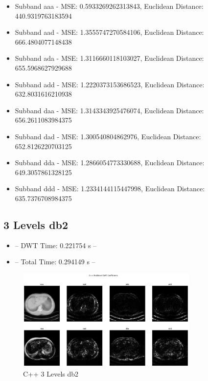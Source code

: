 \documentclass{article}
\begin{document}
\begin{itemize}
    \item Subband aaa - MSE: 0.5933269262313843, Euclidean Distance: 440.9319763183594
    \item Subband aad - MSE: 1.3555747270584106, Euclidean Distance: 666.4804077148438
    \item Subband ada - MSE: 1.3116660118103027, Euclidean Distance: 655.5968627929688
    \item Subband add - MSE: 1.2220373153686523, Euclidean Distance: 632.8031616210938
    \item Subband daa - MSE: 1.3143343925476074, Euclidean Distance: 656.2611083984375
    \item Subband dad - MSE: 1.300540804862976, Euclidean Distance: 652.8126220703125
    \item Subband dda - MSE: 1.2866054773330688, Euclidean Distance: 649.3057861328125
    \item Subband ddd - MSE: 1.2334144115447998, Euclidean Distance: 635.7376708984375
\end{itemize}

\subsection{3 Levels db2}
\begin{itemize}
    \item -- DWT Time: 0.221754 s --
    \item -- Total Time: 0.294149 s --
\end{itemize}


\begin{figure}[H]
    \centering
    \includegraphics[width=0.8\textwidth]{assets/cpp-3-db2.png}
    \caption{C++ 3 Levels db2}
    \label{fig15}
\end{figure}
\end{document}
